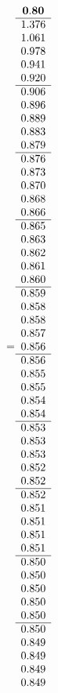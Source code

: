 =\hbox{$\begin{array}{c}
\bf 0.80 
 \\ \hline 
   1.376 \\ 
   1.061 \\ 
   0.978 \\ 
   0.941 \\ 
   0.920
 \\ \hline 
   0.906 \\ 
   0.896 \\ 
   0.889 \\ 
   0.883 \\ 
   0.879
 \\ \hline 
   0.876 \\ 
   0.873 \\ 
   0.870 \\ 
   0.868 \\ 
   0.866
 \\ \hline 
   0.865 \\ 
   0.863 \\ 
   0.862 \\ 
   0.861 \\ 
   0.860
 \\ \hline 
   0.859 \\ 
   0.858 \\ 
   0.858 \\ 
   0.857 \\ 
   0.856
 \\ \hline 
   0.856 \\ 
   0.855 \\ 
   0.855 \\ 
   0.854 \\ 
   0.854
 \\ \hline 
   0.853 \\ 
   0.853 \\ 
   0.853 \\ 
   0.852 \\ 
   0.852
 \\ \hline 
   0.852 \\ 
   0.851 \\ 
   0.851 \\ 
   0.851 \\ 
   0.851
 \\ \hline 
   0.850 \\ 
   0.850 \\ 
   0.850 \\ 
   0.850 \\ 
   0.850
 \\ \hline 
   0.850 \\ 
   0.849 \\ 
   0.849 \\ 
   0.849 \\ 
   0.849
 \end{array}$}
